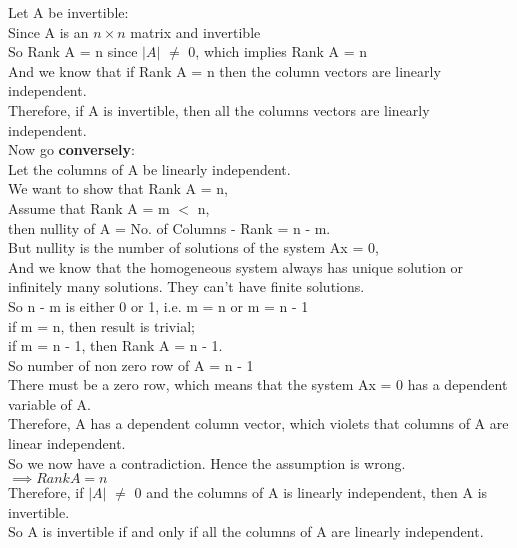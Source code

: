 \documentclass[11pt]{article}
\begin{document}
Let A be invertible:\\
Since A is an $n\times n$ matrix and invertible\\
So Rank A = n since $\lvert A \rvert$ $\neq$ 0, which implies Rank A = n\\
And we know that if Rank A = n then the column vectors are linearly independent.\\
Therefore, if A is invertible, then all the columns vectors are linearly independent.\\
Now go \textbf{conversely}:\\
Let the columns of A be linearly independent.\\
We want to show that Rank A = n,\\
Assume that Rank A = m $<$ n,\\
then nullity of A = No. of Columns - Rank = n - m.\\
But nullity is the number of solutions of the system Ax = 0,\\
And we know that the homogeneous system always has unique solution or infinitely many solutions. They can't have finite solutions.\\
So n - m is either 0 or 1, i.e. m = n or m = n - 1\\
if m = n, then result is trivial;\\
if m = n - 1, then Rank A = n - 1.\\
So number of non zero row of A = n - 1\\
There must be a zero row, which means that the system Ax = 0 has a dependent variable of A.\\
Therefore, A has a dependent column vector, which violets that columns of A are linear independent.\\
So we now have a contradiction. Hence the assumption is wrong. \\
$\implies RankA = n$\\
Therefore, if $\lvert A \rvert$ $\neq$ 0 and the columns of A is linearly independent, then A is invertible.\\
So A is invertible if and only if all the columns of A are linearly independent. \\
\end{document}
